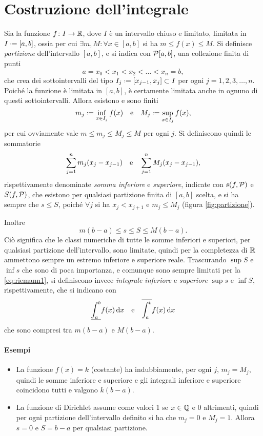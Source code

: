 \section{Costruzione dell'integrale}
Sia la funzione $f\colon I\to\mathbb{R}$, dove $I$ è un intervallo chiuso e limitato, limitata in $I\defeq[a,b]$, ossia per cui $\exists m,M\colon\forall x\in [a,b]$ si ha $m\leq f(x)\leq M$.
Si definisce \emph{partizione} dell'intervallo $[a,b]$, e si indica con $\mathcal{P}[a,b]$, una collezione finita di punti
\[
a=x_0<x_1<x_2<\dots<x_n=b,
\]
che crea dei sottointervalli del tipo $I_j\defeq[x_{j-1},x_j]\subset I$ per ogni $j=1,2,3,\dots,n$. Poiché la funzione è limitata in $[a,b]$, è certamente limitata anche in ognuno di questi sottointervalli. Allora esistono e sono finiti
\[
	m_j\defeq\inf_{x\in I_j}f(x)\qtext{e}M_j\defeq\sup_{x\in I_j}f(x),
\]
per cui ovviamente vale $m\leq m_j\leq M_j\leq M$ per ogni $j$.
Si definiscono quindi le sommatorie
\[
\sum_{j=1}^nm_j(x_j-x_{j-1})\quad\text{e}\quad\sum_{j=1}^nM_j(x_j-x_{j-1}),
\]
rispettivamente denominate \emph{somma inferiore} e \emph{superiore}, indicate con $s(f,\mathcal{P})$ e $S(f,\mathcal{P})$, che esistono per qualsiasi partizione finita di $[a,b]$ scelta, e si ha sempre che $s\leq S$, poiché $\forall j$ si ha $x_j<x_{j+1}$ e $m_j\leq M_j$ (figura \ref{fig:partizione}).

Inoltre
\begin{equation} \label{eq:riemann1}
m(b-a)\leq s\leq S\leq M(b-a).
\end{equation}
Ciò significa che le classi numeriche di tutte le somme inferiori e superiori, per qualsiasi partizione dell'intervallo, sono limitate, quindi per la completezza di $\mathbb{R}$ ammettono sempre un estremo inferiore e superiore reale. Trascurando $\sup S$ e $\inf s$ che sono di poca importanza, e comunque sono sempre limitati per la \eqref{eq:riemann1}, si definiscono invece \emph{integrale inferiore} e \emph{superiore} $\sup s$ e $\inf S$, rispettivamente, che si indicano con
\[
\underline{\int_a^b} f(x)\,\textup{d} x\quad\text{e}\quad\overline{\int_a^b} f(x)\,\textup{d} x
\]
che sono compresi tra $m(b-a)$ e $M(b-a)$.

\paragraph{Esempi}
\begin{itemize}
\item La funzione $f(x)=k$ (costante) ha indubbiamente, per ogni $j$, $m_j=M_j$, quindi le somme inferiore e superiore e gli integrali inferiore e superiore coincidono tutti e valgono $k(b-a)$.
\item La funzione di Dirichlet assume come valori 1 se $x\in\mathbb{Q}$ e 0 altrimenti, quindi per ogni partizione dell'intervallo definito si ha che $m_j=0$ e $M_j=1$. Allora $s=0$ e $S=b-a$ per qualsiasi partizione.
\end{itemize}

